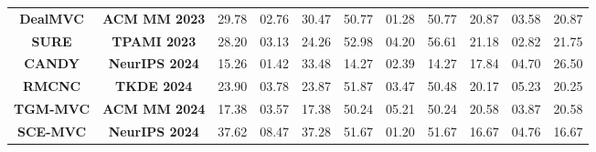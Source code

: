 \documentclass{article}
\theoremstyle{plain}
\theoremstyle{definition}
\theoremstyle{remark}
\begin{document}
\begin{itemize}
\begin{table}[]
{\begin{tabular}{cc|ccc|ccc|ccc}
\multicolumn{1}{c|}{\textbf{DealMVC}} & \textbf{ACM MM 2023}  & 29.78                                 & 02.76                                 & 30.47                                 & 50.77                                 & 01.28                                 & 50.77                                 & 20.87                                 & 03.58                                 & 20.87                                 \\
\multicolumn{1}{c|}{\textbf{SURE}}    & \textbf{TPAMI 2023}   & 28.20                                 & 03.13                                 & 24.26                                 & 52.98                                 & 04.20                                 & 56.61                                 & 21.18                                 & 02.82                                 & 21.75                                 \\
\multicolumn{1}{c|}{\textbf{CANDY}}   & \textbf{NeurIPS 2024} & 15.26                                 & 01.42                                 & 33.48                                 & 14.27                                 & 02.39                                 & 14.27                                 & 17.84                                 & 04.70                                 & 26.50                                 \\
\multicolumn{1}{c|}{\textbf{RMCNC}}   & \textbf{TKDE 2024}    & 23.90                                 & 03.78                                 & 23.87                                 & 51.87                                 & 03.47                                 & 50.48                                 & 20.17                                 & 05.23                                 & 20.25                                 \\
\multicolumn{1}{c|}{\textbf{TGM-MVC}} & \textbf{ACM MM 2024}  & 17.38                                 & 03.57                                 & 17.38                                 & 50.24                                 & 05.21                                 & 50.24                                 & 20.58                                 & 03.87                                 & 20.58                                 \\
\multicolumn{1}{c|}{\textbf{SCE-MVC}} & \textbf{NeurIPS 2024} & {\color[HTML]{3531FF} 37.62}          & {\color[HTML]{3531FF} 08.47}          & 37.28                                 & 51.67                                 & 01.20                                 & 51.67                                 & 16.67                                 & 04.76                                 & 16.67                                 \\

\end{tabular}}
\end{table}
\end{itemize}
\end{document}
